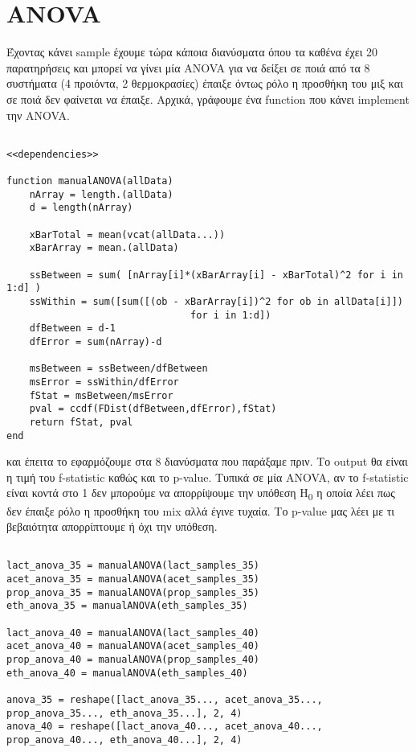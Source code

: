 \documentclass[11pt]{article}
\begin{document}
\section{ANOVA}
\label{sec:org322b1b6}
Έχοντας κάνει sample έχουμε τώρα κάποια διανύσματα όπου τα καθένα έχει 20 παρατηρήσεις και μπορεί να γίνει μία ANOVA για να δείξει σε ποιά από τα 8 συστήματα (4 προιόντα, 2 θερμοκρασίες) έπαιξε όντως ρόλο η προσθήκη του μιξ και σε ποιά δεν φαίνεται να έπαιξε. Αρχικά, γράφουμε ένα function που κάνει implement την ANOVA.

\begin{verbatim}

<<dependencies>>

function manualANOVA(allData)
    nArray = length.(allData)
    d = length(nArray)

    xBarTotal = mean(vcat(allData...))
    xBarArray = mean.(allData)

    ssBetween = sum( [nArray[i]*(xBarArray[i] - xBarTotal)^2 for i in 1:d] )
    ssWithin = sum([sum([(ob - xBarArray[i])^2 for ob in allData[i]])
                                for i in 1:d])
    dfBetween = d-1
    dfError = sum(nArray)-d

    msBetween = ssBetween/dfBetween
    msError = ssWithin/dfError
    fStat = msBetween/msError
    pval = ccdf(FDist(dfBetween,dfError),fStat)
    return fStat, pval
end

\end{verbatim}

και έπειτα το εφαρμόζουμε στα 8 διανύσματα που παράξαμε πριν. Το output θα είναι η τιμή του f-statistic καθώς και το p-value. Τυπικά σε μία ANOVA, αν το f-statistic είναι κοντά στο 1 δεν μπορούμε να απορρίψουμε την υπόθεση H\textsubscript{0} η οποία λέει πως δεν έπαιξε ρόλο η προσθήκη του mix αλλά έγινε τυχαία. Το p-value μας λέει με τι βεβαιότητα απορρίπτουμε ή όχι την υπόθεση.

\begin{verbatim}

lact_anova_35 = manualANOVA(lact_samples_35)
acet_anova_35 = manualANOVA(acet_samples_35)
prop_anova_35 = manualANOVA(prop_samples_35)
eth_anova_35 = manualANOVA(eth_samples_35)

lact_anova_40 = manualANOVA(lact_samples_40)
acet_anova_40 = manualANOVA(acet_samples_40)
prop_anova_40 = manualANOVA(prop_samples_40)
eth_anova_40 = manualANOVA(eth_samples_40)

anova_35 = reshape([lact_anova_35..., acet_anova_35..., prop_anova_35..., eth_anova_35...], 2, 4)
anova_40 = reshape([lact_anova_40..., acet_anova_40..., prop_anova_40..., eth_anova_40...], 2, 4)

\end{verbatim}
\end{document}
